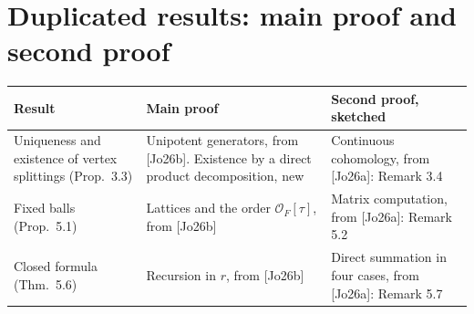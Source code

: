 \documentclass[12pt,letterpaper]{article}
\begin{document}
\section{Duplicated results: main proof and second proof}
\begin{center}
\small
\begin{tabular}{@{}p{}p{}p{}@{}}
\toprule
Result & Main proof & Second proof, sketched\\
\midrule
Uniqueness and existence of vertex splittings (Prop.\ 3.3) & Unipotent generators, from [Jo26b]. Existence by a direct product decomposition, new & Continuous cohomology, from [Jo26a]: Remark 3.4\\
Fixed balls (Prop.\ 5.1) & Lattices and the order $\mathcal O_F[\tau]$, from [Jo26b] & Matrix computation, from [Jo26a]: Remark 5.2\\
Closed formula (Thm.\ 5.6) & Recursion in $r$, from [Jo26b] & Direct summation in four cases, from [Jo26a]: Remark 5.7\\
\bottomrule
\end{tabular}
\end{center}
\end{document}
